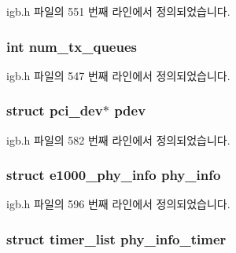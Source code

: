 igb.\+h 파일의 551 번째 라인에서 정의되었습니다.

\subsubsection[{\texorpdfstring{num\+\_\+tx\+\_\+queues}{num_tx_queues}}]{\setlength{\rightskip}{0pt plus 5cm}int num\+\_\+tx\+\_\+queues}\hypertarget{structigb__adapter_ae32ed07b6dc31b3af2218c468eae8578}{}\label{structigb__adapter_ae32ed07b6dc31b3af2218c468eae8578}


igb.\+h 파일의 547 번째 라인에서 정의되었습니다.

\subsubsection[{\texorpdfstring{pdev}{pdev}}]{\setlength{\rightskip}{0pt plus 5cm}struct pci\+\_\+dev$\ast$ pdev}\hypertarget{structigb__adapter_a8ac3abd3ce08c19e5087fe271ef3bcc8}{}\label{structigb__adapter_a8ac3abd3ce08c19e5087fe271ef3bcc8}


igb.\+h 파일의 582 번째 라인에서 정의되었습니다.

\subsubsection[{\texorpdfstring{phy\+\_\+info}{phy_info}}]{\setlength{\rightskip}{0pt plus 5cm}struct {\bf e1000\+\_\+phy\+\_\+info} phy\+\_\+info}\hypertarget{structigb__adapter_af10b60c07fa00f34e25403b7c5c0c009}{}\label{structigb__adapter_af10b60c07fa00f34e25403b7c5c0c009}


igb.\+h 파일의 596 번째 라인에서 정의되었습니다.

\subsubsection[{\texorpdfstring{phy\+\_\+info\+\_\+timer}{phy_info_timer}}]{\setlength{\rightskip}{0pt plus 5cm}struct timer\+\_\+list phy\+\_\+info\+\_\+timer}\hypertarget{structigb__adapter_a7e23bd9ac9e32b5da3f8e807af5b0c5f}{}\label{structigb__adapter_a7e23bd9ac9e32b5da3f8e807af5b0c5f}


